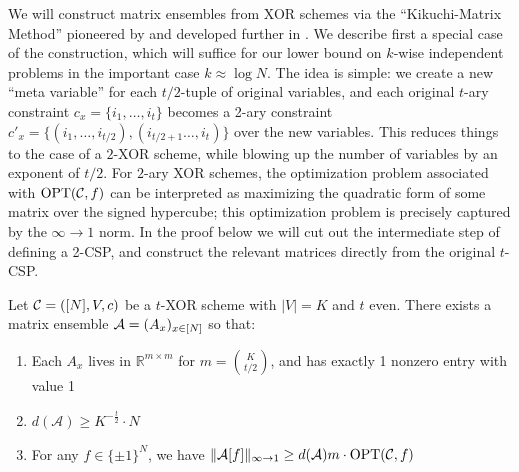 We will construct matrix ensembles from XOR schemes via the ``Kikuchi-Matrix Method'' pioneered by \cite{wein2019kikuchi} and developed further in \cite{smoothed}. We describe first a special case of the construction, which will suffice for our lower bound on $k$-wise independent problems in the important case $k \approx \log N$. The idea is simple: we create a new ``meta variable'' for each $t/2$-tuple of original variables, and each original $t$-ary constraint $c_x = \{i_1,\ldots,i_t\}$ becomes a 2-ary constraint $c'_x = \{(i_1,\ldots, i_{t/2}),(i_{t/2+1}\ldots,i_t)\}$ over the new variables. This reduces things to the case of a $2$-XOR scheme, while blowing up the number of variables by an exponent of $t/2$. For $2$-ary XOR schemes, the optimization problem associated with $\mathrm{OPT}(\mathcal{C},f)$ can be interpreted as maximizing the quadratic form of some matrix over the signed hypercube; this optimization problem is precisely captured by the $\infty\to1$ norm. In the proof below we will cut out the intermediate step of defining a 2-CSP, and construct the relevant matrices directly from the original $t$-CSP.
\begin{lemma}\label{cellprobe:lem:kikuchi-warmup}
Let $\mathcal{C} = ([N],V,c)$ be a $t$-XOR scheme with $|V|=K$ and $t$ even. There exists a matrix ensemble $\mathcal{A} = (A_x )_{x \in [N]}$ so that:
\begin{enumerate}
    \item Each $A_x$ lives in $\mathbb{R}^{m \times m}$ for $m = \binom{K}{t/2}$, and has exactly 1 nonzero entry with value 1
    \item $d(\mathcal{A}) \geq  K^{-\frac{t}{2}} \cdot N$
    \item For any $f \in \{\pm 1\}^N$, we have $\Vert \mathcal{A}[f] \Vert_{\infty \to 1} \geq d(\mathcal{A}) m\cdot \mathrm{OPT}(\mathcal{C},f)$
\end{enumerate}
\end{lemma}


